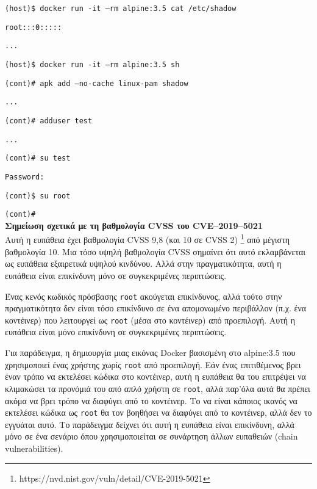 \texttt{\textlatin{(host)\$ docker run -it --rm alpine:3.5 cat /etc/shadow}}

\texttt{\textlatin{root:::0:::::}}

\texttt{\textlatin{...}}

\texttt{\textlatin{(host)\$ docker run -it --rm alpine:3.5 sh}}

\texttt{\textlatin{(cont)\# apk add --no-cache linux-pam shadow}}

\texttt{\textlatin{...}}

\texttt{\textlatin{(cont)\# adduser test}}

\texttt{\textlatin{...}}

\texttt{\textlatin{(cont)\# su test}}

\texttt{\textlatin{Password:}}

\texttt{\textlatin{(cont)\$ su root}}

\texttt{\textlatin{(cont)\#}} \\

\textbf{Σημείωση σχετικά με τη βαθμολογία \textlatin{CVSS} του
\textlatin{CVE–2019–5021}} \\

Αυτή η ευπάθεια έχει βαθμολογία \textlatin{CVSS} 9,8 (και 10 σε
\textlatin{CVSS} 2)
\footnote{\textlatin{https://nvd.nist.gov/vuln/detail/CVE-2019-5021}} από
μέγιστη βαθμολογία 10. Μια τόσο υψηλή βαθμολογία \textlatin{CVSS} σημαίνει ότι
αυτό εκλαμβάνεται ως ευπάθεια εξαιρετικά υψηλού κινδύνου. Αλλά στην
πραγματικότητα, αυτή η ευπάθεια είναι επικίνδυνη μόνο σε συγκεκριμένες
περιπτώσεις.

Ένας κενός κωδικός πρόσβασης \texttt{\textlatin{root}} ακούγεται επικίνδυνος,
αλλά τούτο στην πραγματικότητα δεν είναι τόσο επικίνδυνο σε ένα απομονωμένο
περιβάλλον (π.χ. ένα κοντέινερ) που λειτουργεί ως \texttt{\textlatin{root}}
(μέσα στο κοντέινερ) από προεπιλογή. Αυτή η ευπάθεια είναι μόνο επικίνδυνη σε
συγκεκριμένες περιπτώσεις.

Για παράδειγμα, η δημιουργία μιας εικόνας \textlatin{Docker} βασισμένη στο
\textlatin{alpine:3.5} που χρησιμοποιεί ένας χρήστης χωρίς
\texttt{\textlatin{root}} από προεπιλογή. Εάν ένας επιτιθέμενος βρει έναν τρόπο
να εκτελέσει κώδικα στο κοντέινερ, αυτή η ευπάθεια θα του επιτρέψει να
κλιμακώσει τα προνόμιά του από απλό χρήστη σε \texttt{\textlatin{root}}, αλλά
παρ'όλα αυτά θα πρέπει ακόμα να βρει τρόπο να διαφύγει από το κοντέινερ. Το να
είναι κάποιος ικανός να εκτελέσει κώδικα ως \texttt{\textlatin{root}} θα τον
βοηθήσει να διαφύγει από το κοντέινερ, αλλά δεν το εγγυάται αυτό. Το
παράδειγμα δείχνει ότι αυτή η ευπάθεια είναι επικίνδυνη, αλλά μόνο σε ένα
σενάριο όπου χρησιμοποιείται σε συνάρτηση άλλων ευπαθειών (\textlatin{chain
vulnerabilities}).


